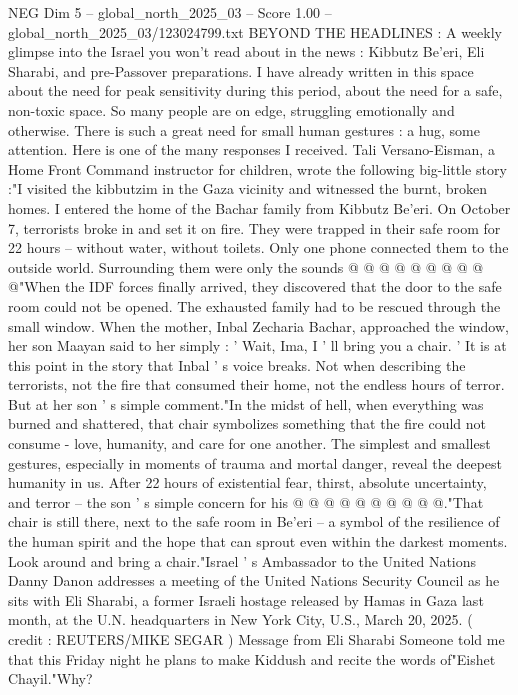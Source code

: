 \begin{textsample}{NEG Dim 5 – global\_north\_2025\_03 – Score 1.00 – global\_north\_2025\_03/123024799.txt}  \label{ex:f5_neg_298}
BEYOND THE HEADLINES : A weekly glimpse into the Israel you won't read about in the news : Kibbutz Be'eri, Eli Sharabi, and pre-Passover preparations.
I have already written in this space about the need for peak sensitivity during this period, about the need for a safe, non-toxic space.
So many people are on edge, struggling emotionally and otherwise.
There is such a great need for small human gestures : a hug, some attention.
Here is one of the many responses I received.
Tali Versano-Eisman, a Home Front Command instructor for children, wrote the following big-little story :"I visited the kibbutzim in the Gaza vicinity and witnessed the burnt, broken homes.
I entered the home of the Bachar family from Kibbutz Be'eri.
On October 7, terrorists broke in and set it on fire.
They were trapped in their safe room for 22 hours -- without water, without toilets.
Only one phone connected them to the outside world.
Surrounding them were only the sounds @ @ @ @ @ @ @ @ @ @"When the IDF forces finally arrived, they discovered that the door to the safe room could not be opened.
The exhausted family had to be rescued through the small window.
When the mother, Inbal Zecharia Bachar, approached the window, her son Maayan said to her simply : ' Wait, Ima, I ' ll bring you a chair. ' It is at this point in the story that Inbal ' s voice breaks.
Not when describing the terrorists, not the fire that consumed their home, not the endless hours of terror.
But at her son ' s simple comment."In the midst of hell, when everything was burned and shattered, that chair symbolizes something that the fire could not consume - love, humanity, and care for one another.
The simplest and smallest gestures, especially in moments of trauma and mortal danger, reveal the deepest humanity in us.
After 22 hours of existential fear, thirst, absolute uncertainty, and terror -- the son ' s simple concern for his @ @ @ @ @ @ @ @ @ @."That chair is still there, next to the safe room in Be'eri -- a symbol of the resilience of the human spirit and the hope that can sprout even within the darkest moments.
Look around and bring a chair."Israel ' s Ambassador to the United Nations Danny Danon addresses a meeting of the United Nations Security Council as he sits with Eli Sharabi, a former Israeli hostage released by Hamas in Gaza last month, at the U.N. headquarters in New York City, U.S., March 20, 2025. ( credit : REUTERS/MIKE SEGAR ) Message from Eli Sharabi Someone told me that this Friday night he plans to make Kiddush and recite the words of"Eishet Chayil."Why?

\end{textsample}
